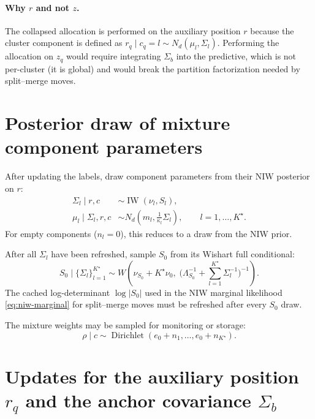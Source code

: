 \documentclass[11pt]{article}
\DeclareMathOperator{\Dir}{Dirichlet}
\DeclareMathOperator{\IW}{IW}
\begin{document}
\paragraph{Why $r$ and not $z$.}
The collapsed allocation is performed on the auxiliary position $r$ because
the cluster component is defined as $r_q\mid c_q=l\sim N_d(\mu_l,\Sigma_l)$.
Performing the allocation on $z_q$ would require integrating $\Sigma_b$
into the predictive, which is not per-cluster (it is global) and would
break the partition factorization needed by split--merge moves.

\section{Posterior draw of mixture component parameters}

After updating the labels, draw component parameters from their NIW
posterior on $r$:
\begin{align}
    \Sigma_l\mid r,c
    &\sim \IW(\nu_l,S_l),
    \label{eq:sigma-posterior}\\
    \mu_l\mid \Sigma_l,r,c
    &\sim N_d\!\left(m_l,\frac{1}{\kappa_l}\Sigma_l\right),
    \qquad l=1,\dots,K^\star.
    \label{eq:mu-posterior}
\end{align}
For empty components ($n_l=0$), this reduces to a draw from the NIW prior.

After all $\Sigma_l$ have been refreshed, sample $S_0$ from its Wishart
full conditional:
\begin{equation}
    S_0\mid\{\Sigma_l\}_{l=1}^{K^\star}
    \sim
    W\!\left(
    \nu_{S_0}+K^\star\nu_0,\;
    \bigl(\Lambda_{S_0}^{-1}+\textstyle\sum_{l=1}^{K^\star}\Sigma_l^{-1}\bigr)^{-1}
    \right).
    \label{eq:S0-gibbs}
\end{equation}
The cached log-determinant $\log|S_0|$ used in the NIW marginal likelihood
\eqref{eq:niw-marginal} for split--merge moves must be refreshed after every
$S_0$ draw.

The mixture weights may be sampled for monitoring or storage:
\begin{equation}
    \rho\mid c\sim\Dir(e_0+n_1,\dots,e_0+n_{K^\star}).
    \label{eq:rho-posterior}
\end{equation}

\section{Updates for the auxiliary position $r_q$ and the anchor covariance $\Sigma_b$}
\end{document}
